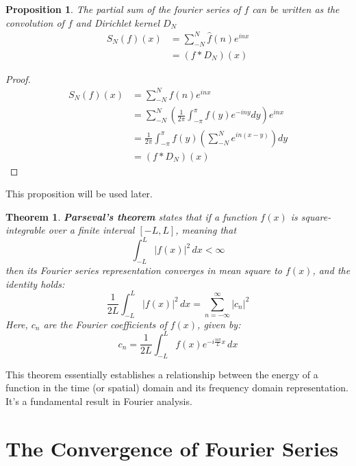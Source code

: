 \documentclass{article}
\newtheorem{theorem}{Theorem}
\newtheorem{proposition}{Proposition}
\begin{document}
\begin{proposition}\label{proposition}
    The partial sum of the fourier series of $ f $ can be written as the convolution of $ f $ and Dirichlet kernel $ D_N $
   \begin{align*}
    S_N(f)(x)&=\sum\limits_{-N}^{N}\hat{f}(n)e^{inx}\\
    &=(f*D_N)(x)
   \end{align*}
\end{proposition}

\begin{proof}
    \begin{align*}
        S_N(f)(x)&=\sum\limits_{-N}^{N}\hat{f}(n)e^{inx}\\
        &=\sum_{-N}^{N}\left(\frac{1}{2\pi}\int_{-\pi}^{\pi}f(y)e^{-iny}dy\right)e^{inx}\\
        &=\frac{1}{2\pi}\int_{-\pi}^{\pi}f(y) \left(\sum_{-N}^{N}e^{in(x-y)} \right)dy\\
        &=(f*D_N)(x)
       \end{align*}
\end{proof}

This proposition will be used later.
\begin{theorem}
    \textbf{Parseval's theorem} states that if a function $f(x)$ is square-integrable over a finite interval $[-L, L]$, meaning that 
    \[
    \int_{-L}^{L} |f(x)|^2 \, dx < \infty 
    \]
    then its Fourier series representation converges in mean square to $f(x)$, and the identity holds:
    \[
    \frac{1}{2L} \int_{-L}^{L} |f(x)|^2 \, dx = \sum_{n=-\infty}^{\infty} |c_n|^2
    \]
    Here, $c_n$ are the Fourier coefficients of $f(x)$, given by:
    \[
    c_n = \frac{1}{2L} \int_{-L}^{L} f(x) e^{-i\frac{n\pi}{L}x} \, dx
    \]
    
\end{theorem}
This theorem essentially establishes a relationship between the energy of a function in the time (or spatial) domain and its frequency domain representation. It's a fundamental result in Fourier analysis.






\newpage

\section{The Convergence of Fourier Series}
\end{document}
